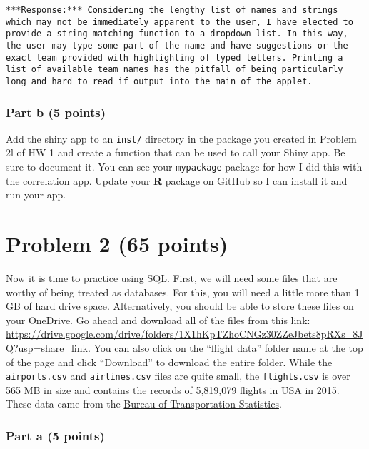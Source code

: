 \documentclass[
]{article}
\begin{document}
\begin{verbatim}
***Response:*** Considering the lengthy list of names and strings which may not be immediately apparent to the user, I have elected to provide a string-matching function to a dropdown list. In this way, the user may type some part of the name and have suggestions or the exact team provided with highlighting of typed letters. Printing a list of available team names has the pitfall of being particularly long and hard to read if output into the main of the applet.
\end{verbatim}

\hypertarget{part-b-5-points}{%
\subsubsection{Part b (5 points)}\label{part-b-5-points}}

Add the shiny app to an \texttt{inst/} directory in the package you
created in Problem 2l of HW 1 and create a function that can be used to
call your Shiny app. Be sure to document it. You can see your
\texttt{mypackage} package for how I did this with the correlation app.
Update your \textbf{R} package on GitHub so I can install it and run
your app.

\hypertarget{problem-2-65-points}{%
\section{Problem 2 (65 points)}\label{problem-2-65-points}}

Now it is time to practice using SQL. First, we will need some files
that are worthy of being treated as databases. For this, you will need a
little more than 1 GB of hard drive space. Alternatively, you should be
able to store these files on your OneDrive. Go ahead and download all of
the files from this link:
\url{https://drive.google.com/drive/folders/1X1hKpTZhoCNGz30ZZeJbets8pRXs_8JQ?usp=share_link}.
You can also click on the ``flight data'' folder name at the top of the
page and click ``Download'' to download the entire folder. While the
\texttt{airports.csv} and \texttt{airlines.csv} files are quite small,
the \texttt{flights.csv} is over 565 MB in size and contains the records
of 5,819,079 flights in USA in 2015. These data came from the
\href{https://www.transtats.bts.gov}{Bureau of Transportation
Statistics}.

\hypertarget{part-a-5-points}{%
\subsubsection{Part a (5 points)}\label{part-a-5-points}}
\end{document}
